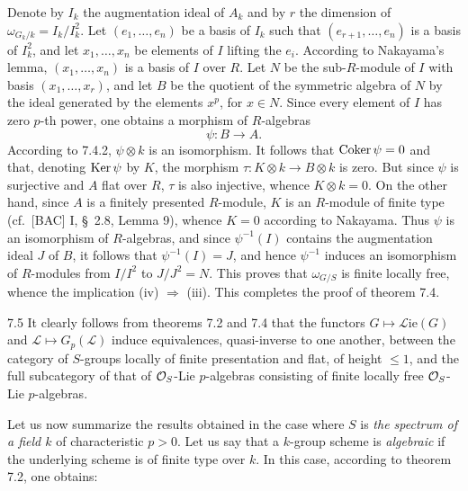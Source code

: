 Denote by $I_k$ the augmentation ideal of $A_k$ and by $r$ the dimension of $\omega_{G_k/k}=I_k/I_k^2$. Let $(e_1,\ldots,e_n)$ be a basis of $I_k$ such that $(e_{r+1},\ldots,e_n)$ is a basis of $I_k^2$, and let $x_1,\ldots,x_n$ be elements of $I$ lifting the $e_i$. According to Nakayama's lemma, $(x_1,\ldots,x_n)$ is a basis of $I$ over $R$. Let $N$ be the sub-$R$-module of $I$ with basis $(x_1,\ldots,x_r)$, and let $B$ be the quotient of the symmetric algebra of $N$ by the ideal generated by the elements $x^p$, for $x\in N$. Since every element of $I$ has zero $p$-th power, one obtains a morphism of $R$-algebras
\[
\psi:B\longrightarrow A.
\]
According to 7.4.2, $\psi\otimes k$ is an isomorphism. It follows that $\operatorname{Coker}\psi=0$ and that, denoting $\operatorname{Ker}\psi$ by $K$, the morphism $\tau:K\otimes k\to B\otimes k$ is zero. But since $\psi$ is surjective and $A$ flat over $R$, $\tau$ is also injective, whence $K\otimes k=0$. On the other hand, since $A$ is a finitely presented $R$-module, $K$ is an $R$-module of finite type (cf.\ [BAC] I, \S~2.8, Lemma 9), whence $K=0$ according to Nakayama. Thus $\psi$ is an isomorphism of $R$-algebras, and since $\psi^{-1}(I)$ contains the augmentation ideal $J$ of $B$, it follows that $\psi^{-1}(I)=J$, and hence $\psi^{-1}$ induces an isomorphism of $R$-modules from $I/I^2$ to $J/J^2=N$. This proves that $\omega_{G/S}$ is finite locally free, whence the implication (iv) $\Rightarrow$ (iii). This completes the proof of theorem 7.4.

\begin{remark}{7.5}\label{VIIA.7.5}
It clearly follows from theorems 7.2 and 7.4 that the functors $G\mapsto\mathscr L\!\mathrm{ie}(G)$ and $\mathscr L\mapsto G_p(\mathscr L)$ induce equivalences, quasi-inverse to one another, between the category of $S$-groups locally of finite presentation and flat, of height $\leq1$, and the full subcategory of that of $\mathcal{O}_S$-Lie $p$-algebras consisting of finite locally free $\mathcal{O}_S$-Lie $p$-algebras.
\end{remark}

Let us now summarize the results obtained in the case where $S$ is \emph{the spectrum of a field $k$} of characteristic $p>0$. Let us say that a $k$-group scheme is \emph{algebraic} if the underlying scheme is of finite type over $k$. In this case, according to theorem 7.2, one obtains:

